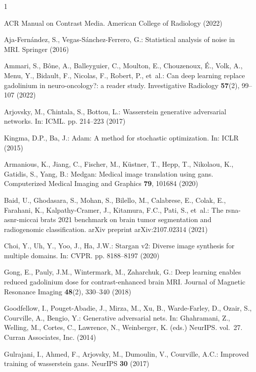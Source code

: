 \documentclass[a4paper,10pt]{article}
\begin{document}
\begin{thebibliography}{1}

ACR Manual on Contrast Media. American College of Radiology (2022)

Aja-Fern{\'a}ndez, S., Vegas-S{\'a}nchez-Ferrero, G.: Statistical analysis of
  noise in MRI. Springer (2016)

Ammari, S., B{\^o}ne, A., Balleyguier, C., Moulton, E., Chouzenoux, {\'E}.,
  Volk, A., Menu, Y., Bidault, F., Nicolas, F., Robert, P., et~al.: Can deep
  learning replace gadolinium in neuro-oncology?: a reader study. Investigative
  Radiology  \textbf{57}(2),  99--107 (2022)

Arjovsky, M., Chintala, S., Bottou, L.: Wasserstein generative adversarial
  networks. In: ICML. pp. 214--223 (2017)


  Kingma, D.P., Ba, J.: Adam: A method for stochastic optimization. In: ICLR
    (2015)

Armanious, K., Jiang, C., Fischer, M., K{\"u}stner, T., Hepp, T., Nikolaou, K.,
  Gatidis, S., Yang, B.: Medgan: Medical image translation using gans.
  Computerized Medical Imaging and Graphics  \textbf{79},  101684 (2020)

Baid, U., Ghodasara, S., Mohan, S., Bilello, M., Calabrese, E., Colak, E.,
  Farahani, K., Kalpathy-Cramer, J., Kitamura, F.C., Pati, S., et~al.: The
  rsna-asnr-miccai brats 2021 benchmark on brain tumor segmentation and
  radiogenomic classification. arXiv preprint arXiv:2107.02314  (2021)

Choi, Y., Uh, Y., Yoo, J., Ha, J.W.: Stargan v2: Diverse image synthesis for
  multiple domains. In: CVPR. pp. 8188--8197 (2020)

Gong, E., Pauly, J.M., Wintermark, M., Zaharchuk, G.: Deep learning enables
  reduced gadolinium dose for contrast-enhanced brain {MRI}. Journal of
  Magnetic Resonance Imaging  \textbf{48}(2),  330--340 (2018)

Goodfellow, I., Pouget-Abadie, J., Mirza, M., Xu, B., Warde-Farley, D., Ozair,
  S., Courville, A., Bengio, Y.: Generative adversarial nets. In: Ghahramani,
  Z., Welling, M., Cortes, C., Lawrence, N., Weinberger, K. (eds.) NeurIPS.
  vol.~27. Curran Associates, Inc. (2014)

Gulrajani, I., Ahmed, F., Arjovsky, M., Dumoulin, V., Courville, A.C.: Improved
  training of wasserstein gans. NeurIPS  \textbf{30} (2017)


\end{thebibliography}
\end{document}
